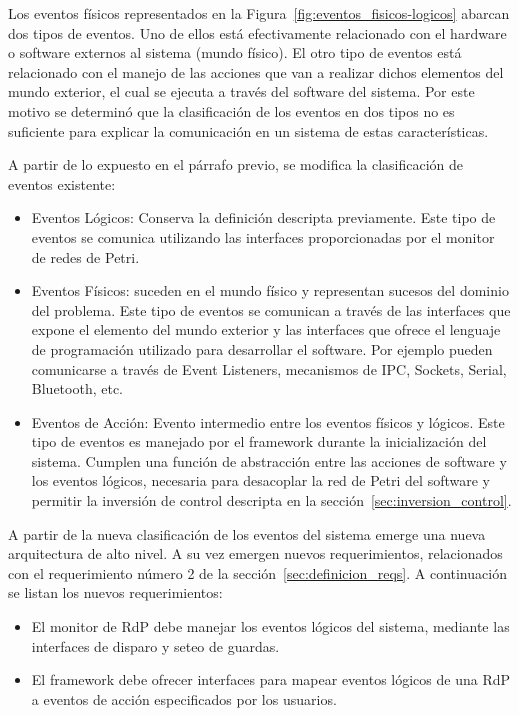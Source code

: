 Los eventos físicos representados en la
Figura~\ref{fig:eventos_fisicos-logicos} abarcan dos tipos de eventos. Uno de
ellos está efectivamente relacionado con el hardware o software externos al
sistema (mundo físico). El otro tipo de eventos está relacionado con el manejo
de las acciones que van a realizar dichos elementos del mundo exterior, el cual
se ejecuta a través del software del sistema.
Por este motivo se determinó que la clasificación de los
eventos en dos tipos no es suficiente para explicar la comunicación en un
sistema de estas características. 

A partir de lo expuesto en el párrafo previo, se modifica la clasificación
de eventos existente:

\begin{itemize}
    \item Eventos Lógicos: Conserva la definición descripta previamente. Este
    tipo de eventos se comunica utilizando las interfaces proporcionadas por el
    monitor de redes de Petri.
    \item Eventos Físicos: suceden en el mundo físico y representan sucesos del
    dominio del problema. Este tipo de eventos se comunican a través de las
    interfaces que expone el elemento del mundo exterior y las interfaces que
    ofrece el lenguaje de programación utilizado para desarrollar el software.
    Por ejemplo pueden comunicarse a través de Event Listeners, mecanismos
    de IPC, Sockets, Serial, Bluetooth, etc.
    \item Eventos de Acción: Evento intermedio
    entre los eventos físicos y lógicos. Este tipo de eventos es manejado
    por el framework durante la inicialización del sistema. Cumplen una función
    de abstracción entre las acciones de software y los eventos lógicos,
    necesaria para desacoplar la red de Petri del software y permitir la
    inversión de control descripta en la sección~\ref{sec:inversion_control}.
\end{itemize}

A partir de la nueva clasificación de los eventos del sistema emerge una nueva
arquitectura de alto nivel. A su vez emergen nuevos requerimientos, relacionados
con el requerimiento número 2 de la sección~\ref{sec:definicion_reqs}. A continuación
se listan los nuevos requerimientos:

\begin{itemize}
  \item El monitor de RdP debe manejar los eventos lógicos del sistema,
  mediante las interfaces de disparo y seteo de guardas.
  \item El framework debe ofrecer interfaces para mapear eventos lógicos de una
  RdP a eventos de acción especificados por los usuarios.
\end{itemize}

